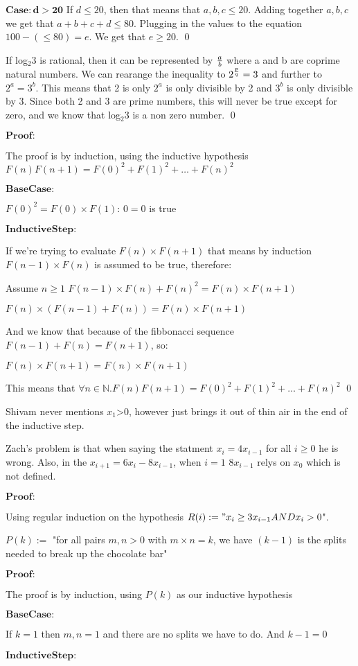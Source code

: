 \documentclass{61200}
\author{Miguel Flores-Acton}
\begin{document}
$\mathbf{Case: d>20}$
If $d \le 20$, then that means that $a,b,c \le 20$. Adding together $a,b,c$
we get that $a+b+c+d \le 80$. Plugging in the values to the equation
$100-(\le80) = e$. We get that $e \ge 20$. \qed

If log$_2 3$ is rational, then it can be represented by $a\over{b}$ where a and b
are coprime natural numbers. We can rearange the inequality to $2^{p\over{q}}=3$
and further to $2^a=3^b$. This means that 2 is only $2^a$ is only divisible by 2
and $3^b$ is only divisible by 3. Since both 2 and 3 are prime numbers, this will
never be true except for zero, and we know that log$_2 3$ is a non zero number. \qed

$\mathbf{Proof:}$

The proof is by induction, using the inductive hypothesis
$F(n)F(n+1)=F(0)^2 + F(1)^2+\ldots+F(n)^2$

$\mathbf{Base Case:}$

$F(0)^2=F(0)\times F(1)$: $0=0$ is true


$\mathbf{Inductive Step:}$

If we're trying to evaluate $F(n)\times F(n+1)$ that means by induction
$F(n-1)\times F(n)$ is assumed to be true, therefore:

Assume $n\geq1$
$F(n-1)\times F(n) + F(n)^2 = F(n)\times F(n+1)$

$F(n)\times (F(n-1) + F(n))= F(n)\times F(n+1)$

And we know that because of the fibbonacci sequence
$F(n-1) + F(n) = F(n+1)$, so:

$F(n)\times F(n+1)= F(n)\times F(n+1)$

This means that $\forall n \in \mathbb{N} . F(n)F(n+1)=F(0)^2 + F(1)^2+\ldots+F(n)^2$
\qed



Shivam never mentions $x_1$>0, however just brings it out of thin air
in the end of the inductive step.

Zach's problem is that when saying the statment $x_i=4x_{i-1}$ for all
$i\ge0$ he is wrong. Also, in the $x_{i+1}=6x_i-8x_{i-1}$, when $i=1$
$8x_{i-1}$ relys on $x_0$ which is not defined.

$\mathbf{Proof:}$

Using regular induction on the hypothesis $R(i):= "x_i \geq3x_{i-1} AND x_i>0$". 



$P(k):=$ "for all pairs $m,n>0$ with $m\times n = k$, we have $(k-1)$ is
the splits needed to break up the chocolate bar"

$\mathbf{Proof:}$

The proof is by induction, using $P(k)$ as our inductive hypothesis

$\mathbf{Base Case:}$

If $k=1$ then $m,n=1$ and there are no splits we have to do.
And $k-1=0$

$\mathbf{Inductive Step:}$
\end{document}
